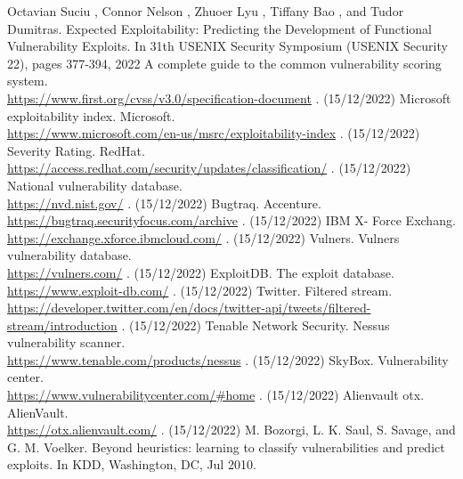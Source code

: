 \documentclass[submit,techreq,noauthor]{eco}	%
\begin{document}
\begin{thebibliography}{99}
   Octavian Suciu , Connor Nelson , Zhuoer Lyu , Tiffany Bao , and Tudor Dumitras.
    \quad Expected Exploitability: Predicting the Development of Functional Vulnerability 
    Exploits. In 31th USENIX Security Symposium (USENIX Security 22), pages 377-394, 2022
    A complete guide to the common vulnerability scoring system.\\
      \url{https://www.first.org/cvss/v3.0/specification-document} . (15/12/2022)
    Microsoft exploitability index. Microsoft.\\
      \url{https://www.microsoft.com/en-us/msrc/exploitability-index} . (15/12/2022)
    Severity Rating. RedHat.\\
      \url{https://access.redhat.com/security/updates/classification/} . (15/12/2022)
    National vulnerability database.\\
      \url{https://nvd.nist.gov/} . (15/12/2022)
    Bugtraq. Accenture.\\
      \url{https://bugtraq.securityfocus.com/archive} . (15/12/2022)
    IBM X- Force Exchang.\\
      \url{https://exchange.xforce.ibmcloud.com/} . (15/12/2022)
    Vulners. Vulners vulnerability database.\\
      \url{https://vulners.com/} . (15/12/2022)
    ExploitDB. The exploit database.\\
      \url{https://www.exploit-db.com/} . (15/12/2022)
    Twitter. Filtered stream.\\
      \url{https://developer.twitter.com/en/docs/twitter-api/tweets/filtered-stream/introduction} . (15/12/2022)
    Tenable Network Security. Nessus vulnerability scanner.\\
      \url{https://www.tenable.com/products/nessus} . (15/12/2022)
    SkyBox. Vulnerability center.\\
      \url{https://www.vulnerabilitycenter.com/#home} . (15/12/2022)
    Alienvault otx. AlienVault.\\
      \url{https://otx.alienvault.com/} . (15/12/2022)
    M. Bozorgi, L. K. Saul, S. Savage, and G. M. Voelker. Beyond heuristics: learning to classify vulnerabilities and predict exploits. In KDD, Washington, DC, Jul 2010.
\end{thebibliography}
\end{document}
